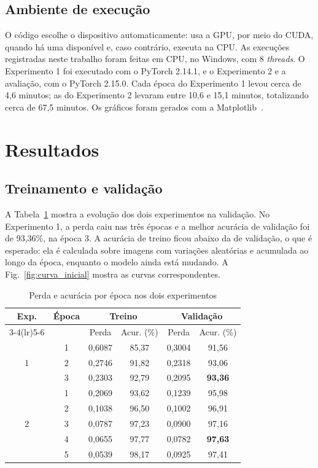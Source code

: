 \documentclass[conference,a4paper]{IEEEtran}
\begin{document}
\subsection{Ambiente de execução}

O código escolhe o dispositivo automaticamente: usa a GPU, por meio do CUDA, quando há uma disponível e, caso contrário, executa na CPU. As execuções registradas neste trabalho foram feitas em CPU, no Windows, com 8 \textit{threads}. O Experimento 1 foi executado com o PyTorch 2.14.1, e o Experimento 2 e a avaliação, com o PyTorch 2.15.0. Cada época do Experimento 1 levou cerca de 4,6 minutos; as do Experimento 2 levaram entre 10,6 e 15,1 minutos, totalizando cerca de 67,5 minutos. Os gráficos foram gerados com a Matplotlib~\cite{hunter2007matplotlib}.

\section{Resultados}
\label{sec:resultados}

\subsection{Treinamento e validação}

A Tabela~\ref{tab:treino} mostra a evolução dos dois experimentos na validação. No Experimento 1, a perda caiu nas três épocas e a melhor acurácia de validação foi de 93,36\%, na época 3. A acurácia de treino ficou abaixo da de validação, o que é esperado: ela é calculada sobre imagens com variações aleatórias e acumulada ao longo da época, enquanto o modelo ainda está mudando. A Fig.~\ref{fig:curva_inicial} mostra as curvas correspondentes.

\begin{table}[H]
\centering
\caption{Perda e acurácia por época nos dois experimentos}
\label{tab:treino}
\begin{tabular}{cccccc}
\toprule
Exp. & Época & \multicolumn{2}{c}{Treino} & \multicolumn{2}{c}{Validação} \\
\cmidrule(lr){3-4}\cmidrule(lr){5-6}
 & & Perda & Acur. (\%) & Perda & Acur. (\%) \\
\midrule
\multirow{3}{*}{1} & 1 & 0,6087 & 85,37 & 0,3004 & 91,56 \\
                   & 2 & 0,2746 & 91,82 & 0,2318 & 93,06 \\
                   & 3 & 0,2303 & 92,79 & 0,2095 & \textbf{93,36} \\
\midrule
\multirow{5}{*}{2} & 1 & 0,2069 & 93,62 & 0,1239 & 95,98 \\
                   & 2 & 0,1038 & 96,50 & 0,1002 & 96,91 \\
                   & 3 & 0,0787 & 97,23 & 0,0900 & 97,16 \\
                   & 4 & 0,0655 & 97,77 & 0,0782 & \textbf{97,63} \\
                   & 5 & 0,0539 & 98,17 & 0,0925 & 97,41 \\
\bottomrule
\end{tabular}
\end{table}
\end{document}
